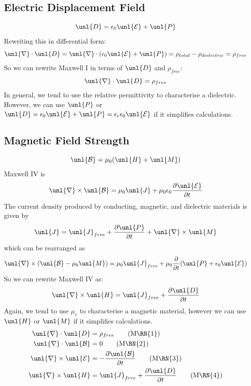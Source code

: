 \documentclass[a4paper, 11pt, normalem]{report}
\newcommand\p{\partial}
\newcommand\E{\mathcal{E}}
\newcommand\uE{\unl{\E}}
\newcommand\B{\mathcal{B}}
\newcommand\uB{\unl{\B}}
\newcommand\del{\unl{\nabla}}
\newcommand\eno{\epsilon_0}
\newcommand\J{\unl{J}}
\newcommand\er{\epsilon_r}
\begin{document}
\subsection{Electric Displacement Field}
\begin{equation*}
	\unl{D} = \eno\uE + \unl{P}
\end{equation*}
Rewriting this in differential form:
\begin{equation*}
	\del\cdot\unl{D} = \del\cdot(\eno\uE+\unl{P}) = \rho_{total} - \rho_{dielectric} = \rho_{free}
\end{equation*}
So we can rewrite Maxwell \RN{1} in terms of $\unl{D}$ and $\rho_{free}$:
\begin{equation*}
	\del\cdot\unl{D} = \rho_{free}
\end{equation*}
In general, we tend to use the relative permittivity to characterise a dielectric.
However, we can use $\unl{P}$ or $\unl{D} = \eno\uE + \unl{P} = \er\eno\uE$ if it simplifies calculations.

\subsection{Magnetic Field Strength}
\begin{equation*}
	\uB = \mu_0(\unl{H}+\unl{M})
\end{equation*}
Maxwell \RN{4} is
\begin{equation*}
	\del\times\uB = \mu_0\J + \mu_0\eno\frac{\p \uE}{\p t}
\end{equation*}
The current density produced by conducting, magnetic, and dielectric materials is given by
\begin{equation*}
	\J = \J_{free} + \frac{\p\unl{P}}{\p t} + \del\times\unl{M}
\end{equation*}
which can be rearranged as
\begin{equation*}
	\del\times(\uB-\mu_0\unl{M}) = \mu_0\J_{free} + \mu_0\frac{\p}{\p t}(\unl{P} + \eno\uE)
\end{equation*}
So we can rewrite Maxwell \RN{4} as:
\begin{equation*}
	\del\times\unl{H} = \J_{free} + \frac{\p\unl{D}}{\p t}
\end{equation*}
Again, we tend to use $\mu_r$ to characterise a magnetic material, however we can use $\unl{H}$ or $\unl{M}$ if it simplifies calculations.
\begin{align*}
	\del\cdot\unl{D} &= \rho_{free} \tag{M\RN{1}} \\
	\del\cdot\uB &= 0 \tag{M\RN{2}} \\
	\del\times\uE &= -\frac{\p\uB}{\p t} \tag{M\RN{3}} \\
	\del\times\unl{H} &= \J_{free} + \frac{\p\unl{D}}{\p t} \tag{M\RN{4}}
\end{align*}
\end{document}

